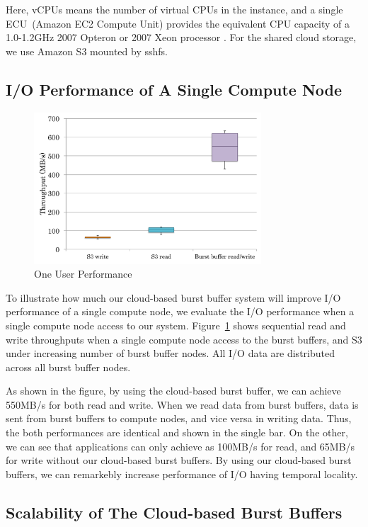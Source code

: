 Here, vCPUs means the number of virtual CPUs in the instance, 
and a single ECU~(Amazon EC2 Compute Unit) provides the equivalent CPU capacity
of a 1.0-1.2GHz 2007 Opteron or 2007 Xeon processor \cite{AMAZON_AWS}.
For the shared cloud storage, we use Amazon S3 mounted by sshfs\cite{sshfs}.

\subsection{I/O Performance of A Single Compute Node}

\begin{figure}
\centering
\includegraphics[width=8.5cm]{img/one_client-2.pdf}
\caption{One User Performance}
\label{evaluation:one user performance}
\end{figure}
To illustrate how much our cloud-based burst buffer system will improve I/O
performance of a single compute node, we evaluate the I/O performance when a
single compute node access to our system.
Figure~\ref{evaluation:one user performance} shows sequential read and write
throughputs when a single compute node access to the burst buffers, and S3
under increasing number of burst buffer nodes. All I/O data are distributed
across all burst buffer nodes.

As shown in the figure, by using the cloud-based burst buffer, we can 
achieve 550MB/s for both read and write.
When we read data from burst buffers, data is sent from burst buffers to compute
nodes, and vice versa in writing data. Thus, the both performances are identical
and shown in the single bar. On the other, we can see that applications
can only achieve as 100MB/s for read, and 65MB/s for write without our
cloud-based burst buffers. By using our cloud-based burst buffers, 
we can remarkebly increase performance of I/O having temporal
locality.

\subsection{Scalability of The Cloud-based Burst Buffers}

